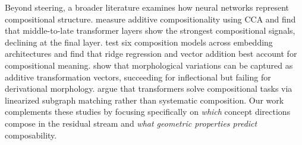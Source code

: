 Beyond steering, a broader literature examines how neural networks
represent compositional structure. \citet{guo2025quantifying} measure
additive compositionality using CCA and find that middle-to-late
transformer layers show the strongest compositional signals, declining at
the final layer. \citet{nagar2025transformer} test six composition models
across embedding architectures and find that ridge regression and vector
addition best account for compositional meaning. \citet{reif2025vocab}
show that morphological variations can be captured as additive
transformation vectors, succeeding for inflectional but failing for
derivational morphology. \citet{dziri2023faith} argue that transformers
solve compositional tasks via linearized subgraph matching rather than
systematic composition. Our work complements these studies by focusing
specifically on \emph{which} concept directions compose in the residual
stream and \emph{what geometric properties predict} composability.
